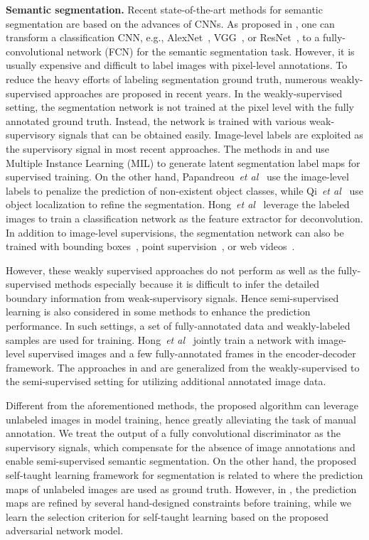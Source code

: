 \documentclass{bmvc2k}
\def\etal{\emph{et al}\bmvaOneDot}
\begin{document}
	
	{\flushleft \bf Semantic segmentation.}
Recent state-of-the-art methods for semantic segmentation are based on the advances of CNNs. As proposed in \cite{fcn}, one can transform a classification CNN, e.g., AlexNet~\cite{alexnet}, VGG~\cite{vgg}, or ResNet~\cite{resnet}, to a fully-convolutional network (FCN) for the semantic segmentation task. 
However, it is usually expensive and difficult to label images with pixel-level annotations. 
To reduce the heavy efforts of labeling segmentation ground truth, numerous weakly-supervised approaches are proposed in recent years.
In the weakly-supervised setting, the segmentation network is not trained at the pixel level with the fully annotated ground truth. Instead, the network is trained with various weak-supervisory signals that can be obtained easily.
Image-level labels are exploited as the supervisory signal in most recent approaches.
The methods in \cite{pinheiro2015weakly} and \cite{pathak2014fully} use Multiple Instance Learning (MIL) to generate latent segmentation label maps for supervised training.
On the other hand, Papandreou~\etal~\cite{papandreou2015weakly} use the image-level labels to penalize the prediction of non-existent object classes, while Qi~\etal~\cite{qi2016augmented} use object localization to refine the segmentation. 
Hong~\etal~\cite{hong2015decoupled} leverage the labeled images to train a classification network as the feature extractor for deconvolution.
In addition to image-level supervisions, the segmentation network can also be trained with bounding boxes~\cite{dai2015boxsup, khoreva_CVPR17}, point supervision~\cite{bearman2016s}, or web videos~\cite{hong2017weakly}.
	
	
	However, these weakly supervised approaches do not perform as well as the fully-supervised methods especially because it is difficult to infer the detailed boundary information 
	from weak-supervisory signals.
Hence semi-supervised learning is also considered in some methods to enhance the prediction performance.
In such settings, a set of fully-annotated data and weakly-labeled samples 
	are used for training.
Hong~\etal~\cite{hong2015decoupled} jointly train a network with image-level supervised images and  a few fully-annotated frames in the encoder-decoder framework. 
The approaches in \cite{dai2015boxsup} and \cite{papandreou2015weakly} are generalized from the weakly-supervised to the semi-supervised setting for utilizing additional annotated image data.
	
Different from the aforementioned methods, the proposed algorithm can leverage unlabeled images in model training, hence greatly alleviating the task of manual annotation.
We treat the output of a fully convolutional discriminator as the supervisory signals, which compensate for the absence of image annotations and enable semi-supervised semantic segmentation.
On the other hand, the proposed self-taught learning framework for segmentation is related to \cite{pathak2015constrained} where the prediction maps of unlabeled images are used as ground truth.
However, in \cite{pathak2015constrained}, the prediction maps are refined by several hand-designed constraints before training, while we learn the selection criterion for self-taught learning based on the proposed adversarial network model. 
	
\end{document}
